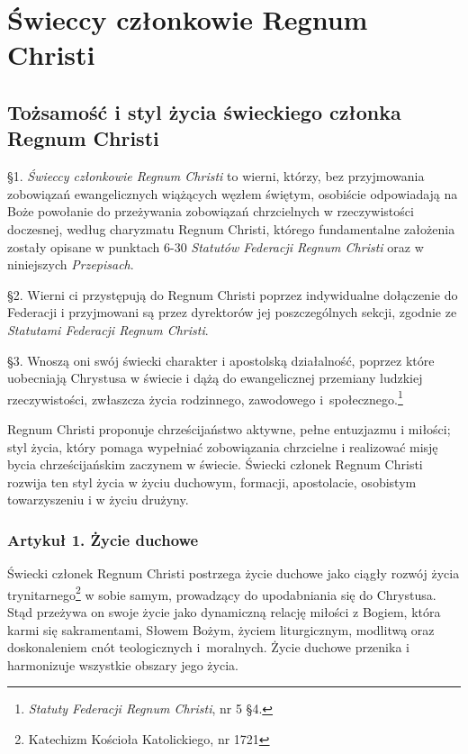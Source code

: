 \part{Świeccy członkowie Regnum Christi}

\chapter{Tożsamość i styl życia świeckiego członka Regnum Christi}


 \S{}1. {\em Świeccy członkowie Regnum Christi} to wierni, którzy, bez przyjmowania zobowiązań ewangelicznych wiążących węzłem świętym, osobiście odpowiadają na Boże powołanie do przeżywania zobowiązań chrzcielnych w rzeczywistości doczesnej, według charyzmatu Regnum Christi, którego fundamentalne założenia zostały opisane w punktach 6-30 {\em Statutów Federacji Regnum Christi} oraz w niniejszych {\em Przepisach}.

\S{}2. Wierni ci przystępują do Regnum Christi poprzez indywidualne dołączenie do Federacji i przyjmowani są przez dyrektorów jej poszczególnych sekcji, zgodnie ze {\em Statutami Federacji Regnum Christi}.

\S{}3. Wnoszą oni swój świecki charakter i apostolską działalność, poprzez które uobecniają Chrystusa w świecie i dążą do ewangelicznej przemiany ludzkiej rzeczywistości, zwłaszcza życia rodzinnego, zawodowego \mbox{i społecznego}.\footnote{{\em Statuty Federacji Regnum Christi}, nr 5 \S{}4.}


 \label{numerdwa}
Regnum Christi proponuje chrześcijaństwo aktywne, pełne entuzjazmu i miłości; styl życia, który pomaga wypełniać zobowiązania chrzcielne i realizować misję bycia chrześcijańskim zaczynem w świecie. Świecki członek Regnum Christi rozwija ten styl życia w życiu duchowym, formacji, apostolacie, osobistym towarzyszeniu i w życiu drużyny.


\section{Artykuł 1. Życie duchowe}


 Świecki członek Regnum Christi postrzega życie duchowe jako ciągły rozwój życia trynitarnego\footnote{Katechizm Kościoła Katolickiego, nr 1721} w sobie samym, prowadzący do upodabniania się do Chrystusa. Stąd przeżywa on swoje życie jako dynamiczną relację miłości z Bogiem, która karmi się sakramentami, Słowem Bożym, życiem liturgicznym, modlitwą oraz doskonaleniem cnót teologicznych \mbox{i moralnych}. Życie duchowe przenika i harmonizuje wszystkie obszary jego życia.

